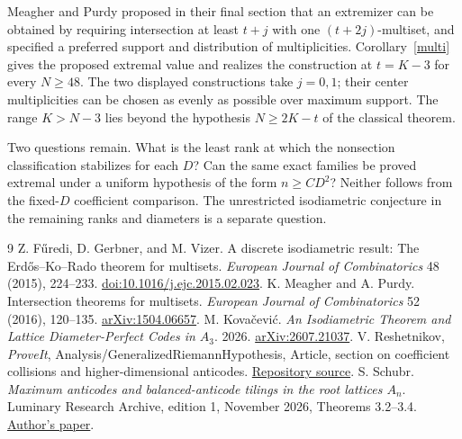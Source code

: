 \documentclass[10pt]{article}
\begin{document}
Meagher and Purdy proposed in their final section \cite{mp} that an extremizer can be obtained by requiring intersection at least $t+j$ with one $(t+2j)$-multiset, and specified a preferred support and distribution of multiplicities. Corollary~\ref{multi} gives the proposed extremal value and realizes the construction at $t=K-3$ for every $N\ge48$. The two displayed constructions take $j=0,1$; their center multiplicities can be chosen as evenly as possible over maximum support. The range $K>N-3$ lies beyond the hypothesis $N\ge 2K-t$ of the classical theorem.

Two questions remain. What is the least rank at which the nonsection classification stabilizes for each $D$? Can the same exact families be proved extremal under a uniform hypothesis of the form $n\ge C D^2$? Neither follows from the fixed-$D$ coefficient comparison. The unrestricted isodiametric conjecture in the remaining ranks and diameters is a separate question.

\begin{thebibliography}{9}
 Z. F\H{u}redi, D. Gerbner, and M. Vizer. A discrete isodiametric result: The Erd\H{o}s--Ko--Rado theorem for multisets. \emph{European Journal of Combinatorics} 48 (2015), 224--233. \href{https://doi.org/10.1016/j.ejc.2015.02.023}{doi:10.1016/j.ejc.2015.02.023}.
 K. Meagher and A. Purdy. Intersection theorems for multisets. \emph{European Journal of Combinatorics} 52 (2016), 120--135. \href{https://arxiv.org/abs/1504.06657}{arXiv:1504.06657}.
 M. Kova\v cevi\'c. \emph{An Isodiametric Theorem and Lattice Diameter-Perfect Codes in $A_3$}. 2026. \href{https://arxiv.org/abs/2607.21037}{arXiv:2607.21037}.
 V. Reshetnikov, \emph{ProveIt}, Analysis/GeneralizedRiemannHypothesis, Article, section on coefficient collisions and higher-dimensional anticodes. \href{https://github.com/VladimirReshetnikov/ProveIt/blob/main/Analysis/GeneralizedRiemannHypothesis/Article/sections/gpp.tex}{Repository source}.
 S. Schubr. \emph{Maximum anticodes and balanced-anticode tilings in the root lattices $A_n$}. Luminary Research Archive, edition 1, November 2026, Theorems 3.2--3.4. \href{https://research.luminaryoddities.org/maximum-anticodes-balanced-anticode-tilings-root-lattices/v/1/files/Anticodes_Root_Lattices.pdf}{Author's paper}.
\end{thebibliography}
\end{document}
